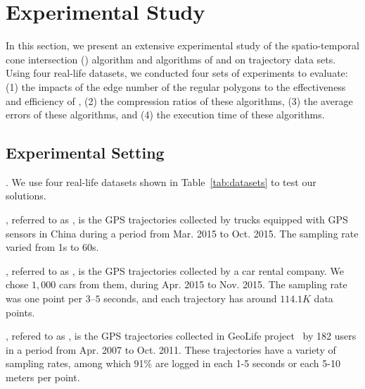 \section{Experimental Study} %
\label{sec-exp}
In this section, we present an extensive experimental study of the spatio-temporal cone intersection (\cist) algorithm and algorithms of \dpa and \squishe on trajectory data sets.
Using four real-life datasets, we conducted four sets of experiments to evaluate:
(1) the impacts of the edge number of the regular polygons to the effectiveness and efficiency of \cist,
(2) the compression ratios of these algorithms,
(3) the average errors of these algorithms, and
(4) the execution time of these algorithms.



\subsection{Experimental Setting}

.
We use four real-life datasets shown in Table~\ref{tab:datasets} to test our solutions.

\eat{
}

, referred to as \truck, is the GPS trajectories collected by  trucks equipped with GPS sensors in China
during a period from Mar. 2015 to Oct. 2015. The sampling rate varied from 1s to 60s.

, referred to as \sercar,  is the GPS trajectories collected by a car rental company.
We chose $1,000$ cars from them, during Apr. 2015 to Nov. 2015. The sampling rate was one point per $3$--$5$ seconds, and
each trajectory has around $114.1K$ data points.

, refered to as \geolife, is the GPS trajectories collected in GeoLife project~\cite{Zheng:GeoLife} by 182 users in a period from Apr. 2007 to Oct. 2011. These trajectories have a variety of sampling rates, among which 91\% are logged in each 1-5 seconds or each 5-10 meters per point.

